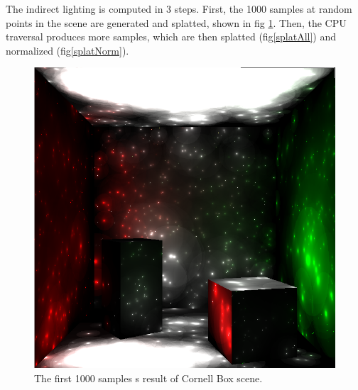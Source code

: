 \documentclass[10pt,twopage]{acmsiggraph}
\begin{document}
The indirect lighting is computed in 3 steps.  First, the 1000 samples at random points in the scene are generated and splatted, shown in fig \ref{splat1000}.  Then, the CPU traversal produces more samples, which are then splatted (fig\ref{splatAll}) and normalized (fig\ref{splatNorm}).

\begin{figure}[htbp]
\begin{center}
\includegraphics[scale = .3]{1000Samples.png}
\caption{The first 1000 samples s result of Cornell Box scene.}
\label{splat1000}
\end{center}
\end{figure}
\end{document}
